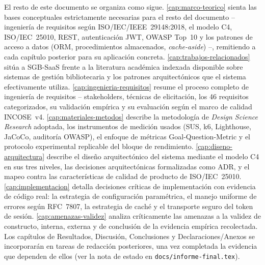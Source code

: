 El resto de este documento se organiza como sigue.
\autoref{cap:marco-teorico} sienta las bases conceptuales estrictamente
necesarias para el resto del documento -- ingeniería de requisitos según
ISO/IEC/IEEE~29148:2018, el modelo C4, ISO/IEC~25010, REST, autenticación
JWT, OWASP Top~10 y los patrones de acceso a datos (ORM, procedimientos
almacenados, \emph{cache-aside}) --, remitiendo a cada capítulo posterior
para su aplicación concreta. \autoref{cap:trabajos-relacionados} sitúa a
SGB-SaaS frente a la literatura académica indexada disponible sobre
sistemas de gestión bibliotecaria y los patrones arquitectónicos que el
sistema efectivamente utiliza. \autoref{cap:ingenieria-requisitos} resume
el proceso completo de ingeniería de requisitos -- stakeholders, técnicas
de elicitación, los 46 requisitos categorizados, su validación empírica y
su evaluación según el marco de calidad INCOSE~v4.
\autoref{cap:materiales-metodos} describe la metodología de \emph{Design
Science Research} adoptada, los instrumentos de medición usados
(SUS, k6, Lighthouse, JaCoCo, auditoría OWASP), el enfoque de métricas
Goal-Question-Metric y el protocolo experimental replicable del bloque de
rendimiento. \autoref{cap:diseno-arquitectura} describe el diseño
arquitectónico del sistema mediante el modelo C4 en sus tres niveles, las
decisiones arquitectónicas formalizadas como ADR, y el mapeo contra las
características de calidad de producto de ISO/IEC~25010.
\autoref{cap:implementacion} detalla decisiones críticas de
implementación con evidencia de código real: la estrategia de
configuración paramétrica, el manejo uniforme de errores según RFC~7807,
la estrategia de caché y el transporte seguro del token de sesión.
\autoref{cap:amenazas-validez} analiza críticamente las amenazas a la
validez de constructo, interna, externa y de conclusión de la evidencia
empírica recolectada. Los capítulos de Resultados, Discusión,
Conclusiones y Declaraciones/Anexos se incorporarán en tareas de
redacción posteriores, una vez completada la evidencia que dependen de
ellos (ver la nota de estado en \texttt{docs/informe-final.tex}).
